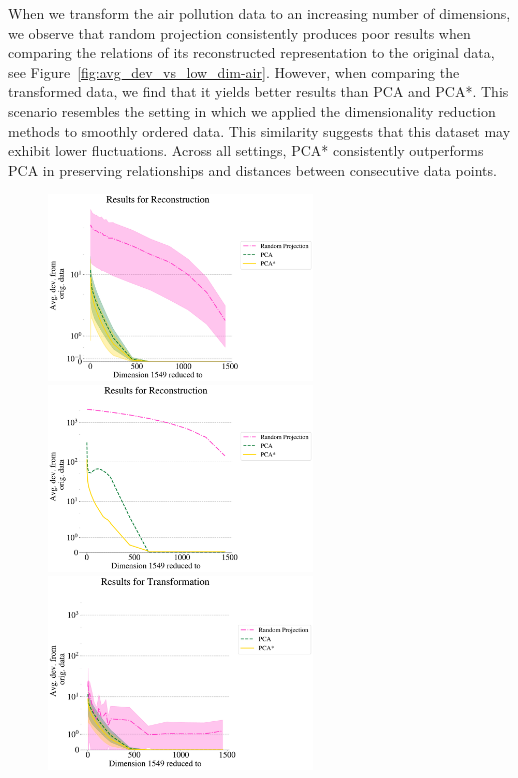 \documentclass[pdftex,12pt,a4paper]{report}
\begin{document}
When we transform the air pollution data to an increasing number of dimensions, we observe that random projection consistently produces poor results when comparing the relations of its reconstructed representation to the original data, see Figure~\ref{fig:avg_dev_vs_low_dim-air}.
However, when comparing the transformed data, we find that it yields better results than PCA and PCA*.
This scenario resembles the setting in which we applied the dimensionality reduction methods to smoothly ordered data.
This similarity suggests that this dataset may exhibit lower fluctuations.
Across all settings, PCA* consistently outperforms PCA in preserving relationships and distances between consecutive data points.

\begin{figure}[htb!]
    \includegraphics[width=7cm]{./images/real-world/russell2000_stock/avg_dev_vs_dyn_low/reconstructed_1lines_504points_euclidean.pdf}
    \includegraphics[width=7cm]{./images/real-world/russell2000_stock/avg_dev_vs_dyn_low/reconstructed_1lines_504points_multiple_scalar_product.pdf}
    \includegraphics[width=7cm]{./images/real-world/russell2000_stock/avg_dev_vs_dyn_low/transformed_1lines_504points_euclidean.pdf}

\end{figure}
\end{document}

